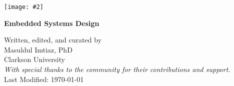 
\newcommand{\centeredimage}[2][0.9\textwidth]{%
  \begin{center}
    \texttt{[image: \#2]} %
  \end{center}
}

\begin{titlepage}
  \begin{center}
    \thispagestyle{empty}
    \vspace*{1cm} %
    \centeredimage[0.75\textwidth]{cover-image.png} %
    \vspace*{1.5cm} %
    
    {{\Huge\bfseries Embedded Systems Design}\\[1em] \par}
    
    \vspace*{\fill}
    {\large Written, edited, and curated by \\[.1cm] Masuldul Imtiaz, PhD \\[.2cm] Clarkson University \\[1em] 
    \normalsize {\itshape With special thanks to the community for their contributions and support.} \\[1em] \vfill 
    \scriptsize Last Modified: \today\par \vfill}
  \end{center}
\end{titlepage}
